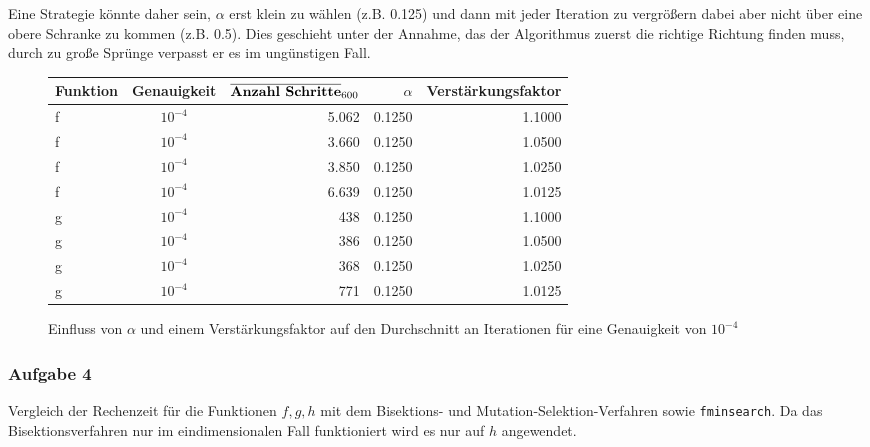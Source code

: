 \documentclass[a4paper, 12pt]{report}
\begin{document}
Eine Strategie könnte daher sein, $\alpha$ erst klein zu wählen (z.B. 0.125) und dann mit jeder Iteration zu vergrößern dabei aber
nicht über eine obere Schranke zu kommen (z.B. 0.5). Dies geschieht unter der Annahme, das der Algorithmus zuerst die richtige
Richtung finden muss, durch zu große Sprünge verpasst er es im ungünstigen Fall.

\begin{figure}[H]
  \centering
  \def\arraystretch{1.25}
  \begin{tabular}{l|c|r|r|r}
    \hline
    \textbf{Funktion} & \textbf{Genauigkeit} & $\overline{ \text{\textbf{Anzahl Schritte}} }_{600}$ & \textbf{$\alpha$} & \textbf{Verstärkungsfaktor}\\
    \hline
    f & $10^{-4}$ & 5.062 & 0.1250 & 1.1000\\
    f & $10^{-4}$ & 3.660 & 0.1250 & 1.0500\\
    f & $10^{-4}$ & 3.850 & 0.1250 & 1.0250\\
    f & $10^{-4}$ & 6.639 & 0.1250 & 1.0125\\
    g & $10^{-4}$ & 438 & 0.1250 & 1.1000\\
    g & $10^{-4}$ & 386 & 0.1250 & 1.0500\\
    g & $10^{-4}$ & 368 & 0.1250 & 1.0250\\
    g & $10^{-4}$ & 771 & 0.1250 & 1.0125\\
    \hline
  \end{tabular}
  \caption{Einfluss von $\alpha$ und einem Verstärkungsfaktor auf den Durchschnitt an Iterationen für eine Genauigkeit von $10^{-4}$}
\end{figure}

\subsubsection{Aufgabe 4}
Vergleich der Rechenzeit für die Funktionen $f, g, h$ mit dem Bisektions- und Mutation-Selektion-Verfahren sowie
\lstinline[basicstyle=\ttfamily\color{black}]|fminsearch|. Da das Bisektionsverfahren nur im eindimensionalen Fall funktioniert
wird es nur auf $h$ angewendet.
\end{document}
